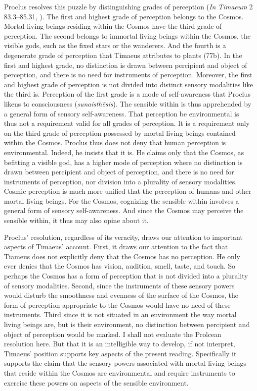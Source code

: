 Proclus resolves this puzzle by distinguishing grades of perception (\emph{In Timaeum} 2 83.3--85.31, \citealt{Diehl:1903re}). The first and highest grade of perception belongs to the Cosmos. Mortal living beings residing within the Cosmos have the third grade of perception. The second belongs to immortal living beings within the Cosmos, the visible gods, such as the fixed stars or the wanderers. And the fourth is a degenerate grade of perception that Timaeus attributes to plants (77b). In the first and highest grade, no distinction is drawn between percipient and object of perception, and there is no need for instruments of perception. Moreover, the first and highest grade of perception is not divided into distinct sensory modalities like the third is. Perception of the first grade is a mode of self-awareness that Proclus likens to consciousness (\emph{sunaisthēsis}). The sensible within is thus apprehended by a general form of sensory self-awareness. That perception be environmental is thus not a requirement valid for all grades of perception. It is a requirement only on the third grade of perception possessed by mortal living beings contained within the Cosmos. Proclus thus does not deny that human perception is environmental. Indeed, he insists that it is. He claims only that the Cosmos, as befitting a visible god, has a higher mode of perception where no distinction is drawn between percipient and object of perception, and there is no need for instruments of perception, nor division into a plurality of sensory modalities. Cosmic perception is much more unified that the perception of humans and other mortal living beings. For the Cosmos, cognizing the sensible within involves a general form of sensory self-awareness. And since the Cosmos may perceive the sensible within, it thus may also opine about it. 

Proclus' resolution, regardless of its veracity, draws our attention to important aspects of Timaeus' account. First, it draws our attention to the fact that Tiameus does not explicitly deny that the Cosmos has no perception. He only ever denies that the Cosmos has vision, audition, smell, taste, and touch. So perhaps the Cosmos has a form of perception that is not divided into a plurality of sensory modalities. Second, since the instruments of these sensory powers would disturb the smoothness and evenness of the surface of the Cosmos, the form of perception appropriate to the Cosmos would have no need of these instruments. Third since it is not situated in an environment the way mortal living beings are, but is their environment, no distinction between percipient and object of perception would be marked. I shall not evaluate the Prolcean resolution here. But that it is an intelligible way to develop, if not interpret, Timaeus' position supports key aspects of the present reading. Specifically it supports the claim that the sensory powers associated with mortal living beings that reside within the Cosmos are environmental and require instruments to exercise these powers on aspects of the sensible environment.

